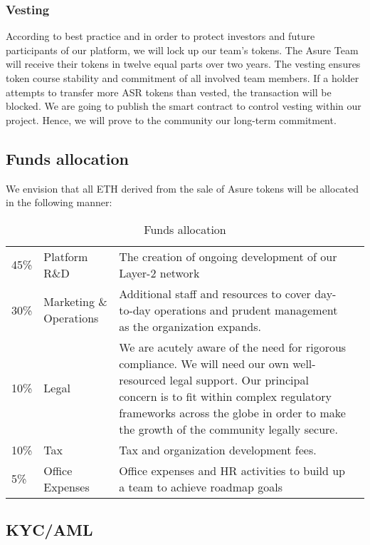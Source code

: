 \subsubsection{Vesting}
According to best practice and in order to protect investors and future participants of our platform, we will lock up our team’s tokens. The Asure Team will receive their tokens in twelve equal parts over two years.
The vesting ensures token course stability and commitment of all involved team members. If a holder attempts to transfer more ASR tokens than vested, the transaction will be blocked.
We are going to publish the smart contract to control vesting within our project. Hence, we will prove to the community our long-term commitment. 

\subsection{Funds allocation}

We envision that all ETH derived from the sale of Asure tokens will be allocated in the following manner:
\newline\newline

\begin{table}[H]
\begin{tabular}{llp{}l}
  45\% & Platform R\&D & The creation of ongoing development of our Layer-2 network \\
  30\% & Marketing \& Operations & Additional staff and resources to cover day-to-day operations and prudent management as the organization expands. \\
  10\% & Legal & We are acutely aware of the need for rigorous compliance. We will need our own well-resourced legal support. Our principal concern is to fit within complex regulatory frameworks across the globe in order to make the growth of the community legally secure. \\
  10\% & Tax & Tax and organization development fees.\\
  5\% & Office Expenses & Office expenses and HR activities to build up
        a team to achieve roadmap goals
\end{tabular}
\caption{\label{tab:table-name}Funds allocation}
\end{table}

\subsection{KYC/AML}

